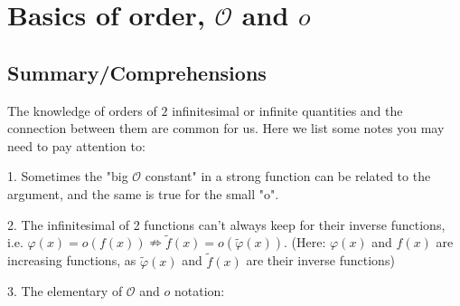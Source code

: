 \newpage
\section{Basics of order, $\mathcal{O}$ and $o$}
\subsection{Summary/Comprehensions}
The knowledge of orders of $2$ infinitesimal or infinite quantities and the connection between them are common for us. 
Here we list some notes you may need to pay attention to: 

1. Sometimes the "big $\mathcal{O}$ constant" in a strong function can be related to the argument, and the same is true for the small 
"o". \\

2. The infinitesimal of 2 functions can't always keep for their inverse functions, i.e. $\varphi(x)=o(f(x)) \nRightarrow 
\widetilde{f}(x)=o(\widetilde{\varphi}(x))$. (Here: $\varphi(x)$ and $f(x)$ are increasing functions, as $\widetilde{\varphi}(x)$ 
and $\widetilde{f}(x)$ are their inverse functions) \\

3. The elementary of $\mathcal{O}$ and $o$ notation: \\


